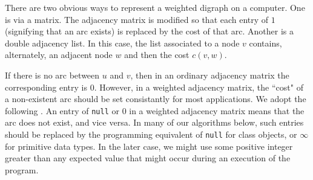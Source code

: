 There are two obvious ways to represent a weighted digraph on a
computer. One is via a matrix. The adjacency matrix is modified so that
each entry of $1$ (signifying that an arc exists) is replaced by the
cost of that arc. Another is a double adjacency list. In this case, the
list associated to a node $v$ contains, alternately, an adjacent node
$w$ and then the cost $c(v, w)$.  

If there is no arc between $u$ and $v$, then in an ordinary adjacency
matrix the corresponding entry is $0$. However, in a weighted adjacency
matrix, the ``cost" of a non-existent arc should be set consistantly 
for most applications. We adopt the following . 
An entry of \verb|null| or $0$ in a weighted 
adjacency matrix
means that the arc does not exist, and vice versa. In many of our
algorithms below, such entries should be replaced by the programming
equivalent of \verb|null| for class objects, or $\infty$ for 
primitive data types.  In the later case, we might use some positive 
integer greater than any expected value that might occur during
an execution of the program. 


